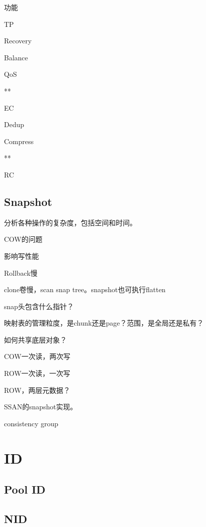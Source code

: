\hrulefill

功能
\begin{enumbox}
\item TP
\item Recovery
\item Balance
\item QoS
\item ***
\item EC
\item Dedup
\item Compress
\item ***
\item RC
\end{enumbox}

\subsection{Snapshot}

分析各种操作的复杂度，包括空间和时间。

\hrulefill

COW的问题
\begin{enumbox}
\item 影响写性能
\item Rollback慢
\item clone卷慢，scan snap tree。snapshot也可执行flatten
\end{enumbox}

snap头包含什么指针？

映射表的管理粒度，是chunk还是page？范围，是全局还是私有？

如何共享底层对象？

COW一次读，两次写

ROW一次读，一次写

ROW，两层元数据？

\hrulefill

SSAN的snapshot实现。

consistency group

\section{ID}

\subsection{Pool ID}

\subsection{NID}

